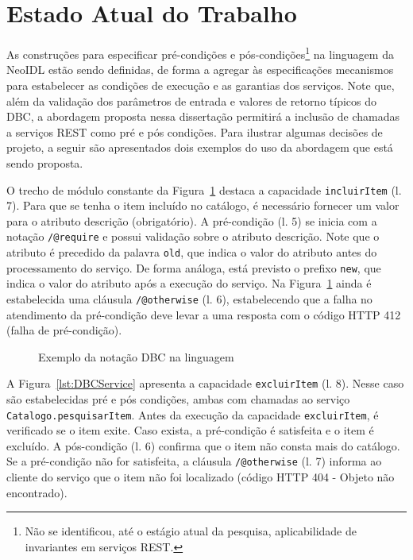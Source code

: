 \section{Estado Atual do Trabalho}\label{sec:estadoAtual}

As constru\c c\~{o}es para especificar pré-condições e pós-condições\footnote{Não se identificou, até o
estágio atual da pesquisa, aplicabilidade de invariantes em
serviços REST.} na linguagem da NeoIDL est\~{a}o sendo definidas, de forma a
agregar às especifica\c c\~{o}es mecanismos para estabelecer as condições de execução e as garantias dos serviços. Note que, além da validação dos parâmetros de entrada e valores de retorno típicos do DBC, a abordagem proposta nessa disserta\c c\~{a}o permitirá a inclusão de chamadas a serviços REST como pré e pós condições. 
Para ilustrar algumas decis\~{o}es de projeto, a seguir s\~{a}o apresentados 
dois exemplos do uso da abordagem que est\'{a} sendo proposta. 

O trecho de módulo \neoidl{} constante da Figura~\ref{lst:DBCSimple} destaca a
capacidade \texttt{incluirItem} (l. 7). Para que se tenha o item incluído no
catálogo, é necessário fornecer um valor para o atributo descrição
(obrigatório). A pré-condição (l. 5) se inicia com a notação
\texttt{/@require} e possui validação sobre o atributo descrição. Note que o
atributo é precedido da palavra \texttt{old}, que indica o valor do atributo antes do processamento do
serviço. De forma an\'{a}loga, est\'{a} previsto o prefixo \texttt{new}, que
indica o valor do atributo após a execução do serviço. Na
Figura~\ref{lst:DBCSimple} ainda \'{e} estabelecida uma cláusula
\texttt{/@otherwise} (l. 6), estabelecendo que a falha no atendimento da
pré-condição deve levar a uma resposta com o código HTTP 412 (falha de
pré-condição).

\begin{figure}[htb]
\begin{scriptsize}

\end{scriptsize}
\caption{Exemplo da notação DBC na linguagem \neoidl}
\label{lst:DBCSimple}
\end{figure}

A Figura~\ref{lst:DBCService} apresenta a capacidade \texttt{excluirItem} (l.
8). Nesse caso são estabelecidas pré e pós condições, ambas com chamadas ao
serviço \texttt{Catalogo.pesquisarItem}. Antes da execução da capacidade
\texttt{excluirItem}, é verificado se o item exite. Caso exista, a pré-condição é
satisfeita e o item é excluído. A pós-condição (l. 6) confirma que o item não
consta mais do catálogo. Se a pré-condição não for satisfeita, a cláusula
\texttt{/@otherwise} (l. 7) informa ao cliente do serviço que o item não foi
localizado (código HTTP 404 - Objeto não encontrado).


